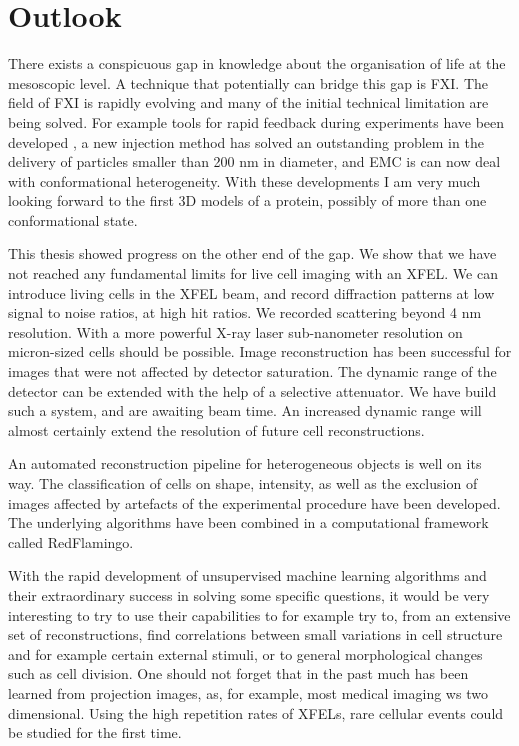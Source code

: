 \chapter{Outlook}
There exists a conspicuous gap in knowledge about the organisation of life at the mesoscopic level. A technique that potentially can bridge this gap is FXI. The field of FXI is rapidly evolving and many of the initial technical limitation are being solved. For example tools for rapid feedback during experiments have been developed \cite{Daurer2016}, a new injection method has solved an outstanding problem in the delivery of particles smaller than 200 nm in diameter, and EMC is can now deal with conformational heterogeneity. With these developments I am very much looking forward to the first 3D models of a protein, possibly of more than one conformational state. 

This thesis showed progress on the other end of the gap. We show that we have not reached any fundamental limits for live cell imaging with an XFEL. We can introduce living cells in the XFEL beam, and record diffraction patterns at low signal to noise ratios, at high hit ratios. We recorded scattering beyond 4 nm resolution. With a more powerful X-ray laser sub-nanometer resolution on micron-sized cells should be possible. Image reconstruction has been successful for images that were not affected by detector saturation. The dynamic range of the detector can be extended with the help of a selective attenuator. We have build such a system, and are awaiting beam time. An increased dynamic range will almost certainly extend the resolution of future cell reconstructions. 

An automated reconstruction pipeline for heterogeneous objects is well on its way. The classification of cells on shape, intensity, as well as the exclusion of images affected by artefacts of the experimental procedure have been developed. The underlying algorithms have been combined in a computational framework called RedFlamingo.

With the rapid development of unsupervised machine learning algorithms and their extraordinary success in solving some specific questions, it would be very interesting to try to use their capabilities to for example try to, from an extensive set of reconstructions, find correlations between small variations in cell structure and for example certain external stimuli, or to general morphological changes such as cell division. One should not forget that in the past much has been learned from projection images, as, for example, most medical imaging ws two dimensional. Using the high repetition rates of XFELs, rare cellular events could be studied for the first time.

